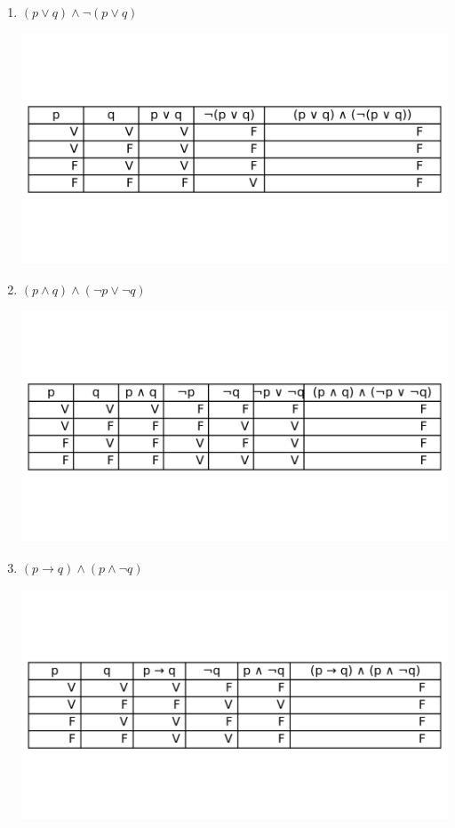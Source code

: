 \documentclass[12pt,letterpaper]{exam}
\begin{document}
\begin{enumerate}
\begin{enumerate}[label=\alph*)]
 \newpage
  \item $(p \lor q) \land \neg(p \lor q)$  
  \begin{center}
    \includegraphics[height=0.3\textheight]{../assets/Talleres_fundamentos/ercicio_9_tabla_03.png}
  \end{center}

  \item $(p \land q) \land (\neg p \lor \neg q)$  
  \begin{center}
    \includegraphics[height=0.3\textheight]{../assets/Talleres_fundamentos/ercicio_9_tabla_04.png}
  \end{center}
 \newpage
  \item $(p \rightarrow q) \land (p \land \neg q)$  
  \begin{center}
    \includegraphics[height=0.3\textheight]{../assets/Talleres_fundamentos/ercicio_9_tabla_05.png}
  \end{center}
\end{enumerate}



\end{enumerate}
\end{document}
